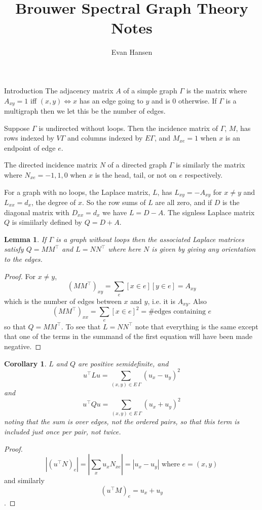 \documentclass{article}
\newtheorem{cor}{Corollary}
\newtheorem{lemma}{Lemma}
\begin{document}
\title{Brouwer Spectral Graph Theory Notes}
\author{Evan Hansen}
\maketitle

\begin{section}{Introduction}
  The adjacency matrix $A$ of a simple graph $\Gamma$ is the matrix where $A_{xy} = 1$ iff $(x,y) \iff x$ has an edge going to $y$ and is 0 otherwise.
  If $\Gamma$ is a multigraph then we let this be the number of edges.

  Suppose $\Gamma$ is undirected without loops.
  Then the incidence matrix of $\Gamma$, $M$, has rows indexed by $V \Gamma$ and columns indexed by $E \Gamma$, and $M_{xe} = 1$ when $x$ is an endpoint of edge $e$.

  The directed incidence matrix $N$ of a directed graph $\Gamma$ is similarly the matrix where $N_{xe} = -1,1,0$ when $x$ is the head, tail, or not on $e$ respectively.
  
  For a graph with no loops, the Laplace matrix, $L$, has $L_{xy} = - A_{xy}$ for $x \neq y$ and $L_{xx} = d_x$, the degree of $x$.
  So the row sums of $L$ are all zero, and if $D$ is the diagonal matrix with $D_{xx} = d_x$ we have $L = D - A$.
  The signless Laplace matrix $Q$ is simiilarly defined by $Q = D + A$.

  \begin{lemma}
    If $\Gamma$ is a graph without loops then the associated Laplace matrices satisfy $Q = MM^\intercal$ and $L = NN^\intercal$ where here $N$ is given by giving any orientation to the edges.
  \end{lemma}
  \begin{proof}
    For $x \neq y$,
    $$
    (MM^\intercal)_{xy} = \sum_e [x \in e][y \in e] = A_{xy}
    $$
    which is the number of edges between $x$ and $y$, i.e. it is $A_{xy}$.
    Also
    $$
    (MM^\intercal)_{xx} = \sum_e [x \in e]^2 = \#\text{edges containing $e$}
    $$
    so that $Q = MM^\intercal$.
    To see that $L = NN^\intercal$ note that everything is the same except that one of the terms in the summand of the first equation will have been made negative.
  \end{proof}
  \begin{cor}
    $L$ and $Q$ are positive semidefinite, and
    $$u^\intercal L u = \sum_{(x,y) \in E~\Gamma}(u_x - u_y)^2$$
    and
    $$u^\intercal Q u = \sum_{(x,y) \in E~\Gamma}(u_x + u_y)^2$$
    noting that the sum is over edges, not the ordered pairs, so that this term is included just once per pair, not twice.
  \end{cor}
  \begin{proof}
    $$|(u^\intercal N)_e| = |\sum_x u_xN_{xe}| = |u_x - u_y| \text{ where $e = (x,y)$}$$
    and similarly
    $$(u^\intercal M)_e = u_x + u_y$$.
  \end{proof}


\end{section}
\end{document}
